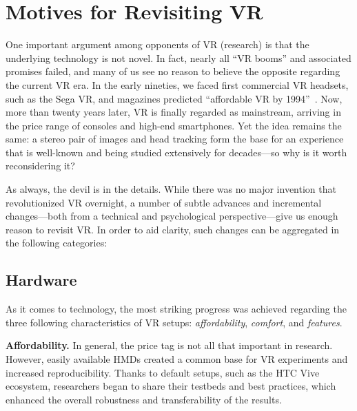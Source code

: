 

\section{Motives for Revisiting VR}

One important argument among opponents of VR (research) is that the underlying technology is not novel. In fact, nearly all ``VR booms'' and associated promises failed, and many of us see no reason to believe the opposite regarding the current VR era. In the early nineties, we faced first commercial VR headsets, such as the Sega VR, and magazines predicted ``affordable VR by 1994''~\cite{engler1992affordable}. Now, more than twenty years later, VR is finally regarded as mainstream, arriving in the price range of consoles and high-end smartphones. Yet the idea remains the same: a stereo pair of images and head tracking form the base for an experience that is well-known and being studied extensively for decades---so why is it worth reconsidering it? 

As always, the devil is in the details. While there was no major invention that revolutionized VR overnight, a number of subtle advances and incremental changes---both from a technical and psychological perspective---give us enough reason to revisit VR. In order to aid clarity, such changes can be aggregated in the following categories:

\subsection{Hardware}

As it comes to technology, the most striking progress was achieved regarding the three following characteristics of VR setups: \textit{affordability}, \textit{comfort}, and \textit{features}. 

\textbf{Affordability.} In general, the price tag is not all that important in research. However, easily available HMDs created a common base for VR experiments and increased reproducibility. Thanks to default setups, such as the HTC Vive ecosystem, researchers began to share their testbeds and best practices, which enhanced the overall robustness and transferability of the results. 



